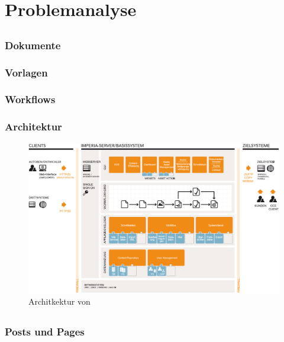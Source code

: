 \chapter{Problemanalyse}
    \label{chapter:ProblemAnalysis}
    \section{\imperia}
        \subsection{Dokumente}
        \subsection{Vorlagen}
        \subsection{Workflows}
        \subsection{Architektur}
            \begin{figure}[hbt]
                \centering
                \includegraphics[width=\textwidth]{../resources/imperia/architektur.png}
                \caption{Architkektur von {\imperia} \cite{imperia:ecmd}}
                \label{image:imperiaArchitektur}
            \end{figure}

    \section{\wordpress}
        \subsection{Posts und Pages}
